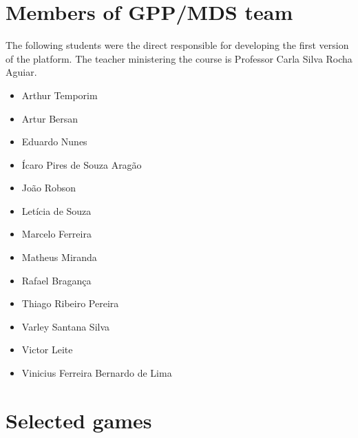 \begin{apendicesenv}

\partapendices

\chapter{Members of GPP/MDS team}
\label {sec:apendice_a}

The following students were the direct responsible for developing the first version of the platform. The teacher ministering the course is Professor Carla Silva Rocha Aguiar.

\begin{itemize}
\item Arthur Temporim
\item Artur Bersan
\item Eduardo Nunes
\item Ícaro Pires de Souza Aragão
\item João Robson
\item Letícia de Souza
\item Marcelo Ferreira
\item Matheus Miranda
\item Rafael Bragança
\item Thiago Ribeiro Pereira
\item Varley Santana Silva
\item Victor Leite
\item Vinicius Ferreira Bernardo de Lima
\end{itemize}

\chapter{Selected games}

\end{apendicesenv}
